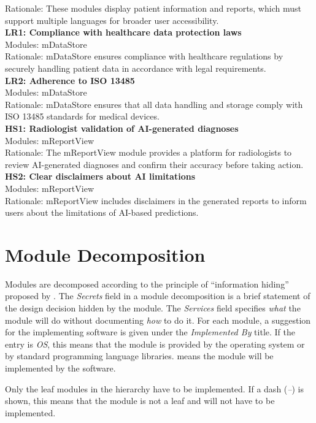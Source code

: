 \documentclass[12pt, titlepage]{article}
\begin{document}
Rationale: These modules display patient information and reports, which must support multiple languages for broader user accessibility. \\
\textbf{LR1: Compliance with healthcare data protection laws} \\
Modules: mDataStore \\
Rationale: mDataStore ensures compliance with healthcare regulations by securely handling patient data in accordance with legal requirements. \\
\textbf{LR2: Adherence to ISO 13485} \\
Modules: mDataStore \\
Rationale: mDataStore ensures that all data handling and storage comply with ISO 13485 standards for medical devices. \\
\textbf{HS1: Radiologist validation of AI-generated diagnoses} \\
Modules: mReportView \\
Rationale: The mReportView module provides a platform for radiologists to review AI-generated diagnoses and confirm their accuracy before taking action. \\
\textbf{HS2: Clear disclaimers about AI limitations} \\
Modules: mReportView \\
Rationale: mReportView includes disclaimers in the generated reports to inform users about the limitations of AI-based predictions. \\

\section{Module Decomposition} \label{SecMD}

Modules are decomposed according to the principle of ``information hiding''
proposed by \citet{ParnasEtAl1984}. The \emph{Secrets} field in a module
decomposition is a brief statement of the design decision hidden by the
module. The \emph{Services} field specifies \emph{what} the module will do
without documenting \emph{how} to do it. For each module, a suggestion for the
implementing software is given under the \emph{Implemented By} title. If the
entry is \emph{OS}, this means that the module is provided by the operating
system or by standard programming language libraries.  \emph{\progname{}} means the
module will be implemented by the \progname{} software.

Only the leaf modules in the hierarchy have to be implemented. If a dash
(\emph{--}) is shown, this means that the module is not a leaf and will not have
to be implemented.
\end{document}
